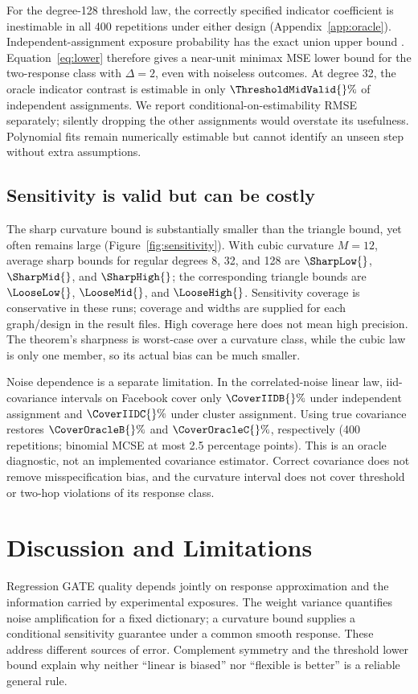 \documentclass{article}
\begin{document}
For the degree-128 threshold law, the correctly specified indicator coefficient is inestimable in all 400 repetitions under either design (Appendix~\ref{app:oracle}). Independent-assignment exposure probability has the exact union upper bound \texttt{\ThresholdUB{}}. Equation~\eqref{eq:lower} therefore gives a near-unit minimax MSE lower bound for the two-response class with $\Delta=2$, even with noiseless outcomes. At degree 32, the oracle indicator contrast is estimable in only $\ThresholdMidValid{}\%$ of independent assignments. We report conditional-on-estimability RMSE separately; silently dropping the other assignments would overstate its usefulness. Polynomial fits remain numerically estimable but cannot identify an unseen step without extra assumptions.

\subsection{Sensitivity is valid but can be costly}
The sharp curvature bound is substantially smaller than the triangle bound, yet often remains large (Figure~\ref{fig:sensitivity}). With cubic curvature $M=12$, average sharp bounds for regular degrees 8, 32, and 128 are $\SharpLow{}$, $\SharpMid{}$, and $\SharpHigh{}$; the corresponding triangle bounds are $\LooseLow{}$, $\LooseMid{}$, and $\LooseHigh{}$. Sensitivity coverage is conservative in these runs; coverage and widths are supplied for each graph/design in the result files. High coverage here does not mean high precision. The theorem's sharpness is worst-case over a curvature class, while the cubic law is only one member, so its actual bias can be much smaller.

Noise dependence is a separate limitation. In the correlated-noise linear law, iid-covariance intervals on Facebook cover only $\CoverIIDB{}\%$ under independent assignment and $\CoverIIDC{}\%$ under cluster assignment. Using true covariance restores $\CoverOracleB{}\%$ and $\CoverOracleC{}\%$, respectively (400 repetitions; binomial MCSE at most 2.5 percentage points). This is an oracle diagnostic, not an implemented covariance estimator. Correct covariance does not remove misspecification bias, and the curvature interval does not cover threshold or two-hop violations of its response class.



\section{Discussion and Limitations}
Regression GATE quality depends jointly on response approximation and the information carried by experimental exposures. The weight variance quantifies noise amplification for a fixed dictionary; a curvature bound supplies a conditional sensitivity guarantee under a common smooth response. These address different sources of error. Complement symmetry and the threshold lower bound explain why neither ``linear is biased'' nor ``flexible is better'' is a reliable general rule.
\end{document}

